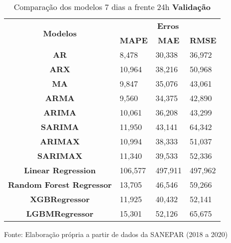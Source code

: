 \begin{table}[H]
	\centering
	\caption{Comparação dos modelos 7 dias a frente 24h \textbf{Validação} }\label{tb:10-24vld}
	\begin{tabular}{@{}clll@{}}
		\toprule
		\multirow{2}{*}{\textbf{Modelos}} & \multicolumn{3}{c}{\textbf{Erros}}                                                                       \\ \cmidrule(l){2-4} 
		& \multicolumn{1}{c}{\textbf{MAPE}} & \multicolumn{1}{c}{\textbf{MAE}} & \multicolumn{1}{c}{\textbf{RMSE}} \\ \hline
\textbf{AR}                       & 8,478                             & 30,338                           & 36,972                            \\
\textbf{ARX}                      & 10,964                            & 38,216                           & 50,968                            \\
\textbf{MA}                       & 9,847                             & 35,076                           & 43,061                            \\
\textbf{ARMA}                     & 9,560                             & 34,375                           & 42,890                            \\
\textbf{ARIMA}                    & 10,061                            & 36,208                           & 43,299                            \\
\textbf{SARIMA}                   & 11,950                            & 43,141                           & 64,342                            \\
\textbf{ARIMAX}                   & 10,994                            & 38,333                           & 51,037                            \\
\textbf{SARIMAX}                  & 11,340                            & 39,533                           & 52,336                            \\
\textbf{Linear Regression}        & 106,577                           & 497,911                          & 497,962                           \\
\textbf{Random Forest Regressor}  & 13,705                            & 46,546                           & 59,266                            \\
\textbf{XGBRegressor}             & 11,925                            & 40,432                           & 52,141                            \\
\textbf{LGBMRegressor}            & 15,301                            & 52,126                           & 65,675                            \\ \bottomrule
	\end{tabular}

Fonte: Elaboração própria a partir de dados da SANEPAR (2018 a 2020)
\end{table}

